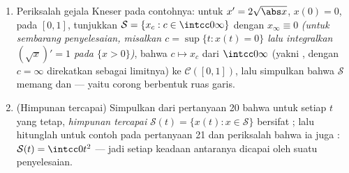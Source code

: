 \begin{problem}[{Soal akhir pekan --- keberadaan penyelesaian
$x' = f(t, x)$ tanpa Lipschitz}]
\begin{enumerate}[resume]
        membuktikannya.)
  \item Periksalah gejala Kneser pada contohnya: untuk $x' =
        2\sqrt{\abs x}$, $x(0) = 0$, pada $[0, 1]$, tunjukkan
        $\mathcal S = \{x_c : c \in \intcc0\infty\}$ dengan
        $x_\infty \equiv 0$ \emph{(untuk sembarang penyelesaian, misalkan $c =
        \sup\{t : x(t) = 0\}$ lalu integralkan $(\sqrt x)' = 1$ pada
        $\{x > 0\}$)}, bahwa $c \mapsto x_c$  dari
        $\intcc0\infty$ (yakni , dengan
        $c = \infty$ direkatkan sebagai limitnya) ke $\mathcal C([0,1])$,
        lalu simpulkan bahwa $\mathcal S$ memang  dan
         --- yaitu corong berbentuk ruas garis.
  \item (Himpunan tercapai) Simpulkan dari pertanyaan 20 bahwa untuk setiap
        $t$ yang tetap, \emph{himpunan tercapai} $\mathcal S(t) =
        \{x(t) : x \in \mathcal S\}$ bersifat ; lalu hitunglah untuk
        contoh pada pertanyaan 21 dan periksalah bahwa ia juga
        : $\mathcal S(t) = \intcc0{t^2}$ --- jadi setiap
        keadaan antaranya dicapai oleh suatu penyelesaian.
\end{enumerate}


\end{problem}
